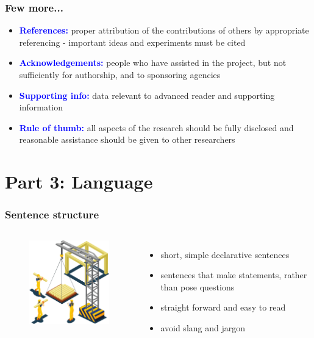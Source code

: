 \documentclass[newPxFont,sthlmFooter]{beamer}
\newcommand{\fs}{\footnotesize}
\begin{document}
\begin{frame}\frametitle{Few more...}
  \vspace{-0.5cm}
  \begin{itemize}
    \fs
  \item \textcolor{blue}{\bf References:} proper attribution of the contributions of others by appropriate referencing - important ideas and experiments must be cited
  \item \textcolor{blue}{\bf Acknowledgements:} people who have assisted in the project, but not sufficiently for authorship, and to sponsoring agencies
  \item \textcolor{blue}{\bf Supporting info:} data relevant to advanced reader and supporting information
  \item \textcolor{blue}{\bf Rule of thumb:} all aspects of the research should be fully disclosed and reasonable assistance should be given to other researchers
  \end{itemize}
\end{frame}

\section{Part 3: Language}

\begin{frame}\frametitle{Sentence structure}
  \begin{columns}[T,onlytextwidth]
  \begin{figure}
    \centering
    \includegraphics[width=2in]{figs/build} 
  \end{figure}
      \vspace{1cm}
  \begin{itemize}
  \fs
  \item short, simple declarative sentences
  \item sentences that make statements, rather than pose questions
  \item straight forward and easy to read
  \item avoid slang and jargon
  \end{itemize}
  \vspace{-2cm}
  \end{columns}
\end{frame}
\end{document}
